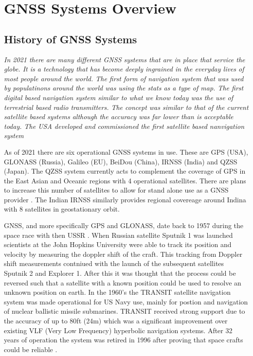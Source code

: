 
\chapter{GNSS Systems Overview} %

\label{Chapter2} %


\section{History of GNSS Systems}
\emph{In 2021 there are many different GNSS systems that are in place that service the globe. It is a technology that has become deeply ingrained in the everyday lives of
most people around the world. The first form of navigation system that was used by populatinons around the world was using the stats as a type of map. The first digital
based navigation system similar to what we know today was the use of terrestrial based radio transmitters. The concept was similar to that of the current satellite based
systems although the accuracy was far lower than is acceptable today. The USA developed and commissioned the first satellite based nanvigation system}

As of 2021 there are six operational GNSS systems in use. These are GPS (USA), GLONASS (Russia), Galileo (EU), BeiDou (China), IRNSS (India) and QZSS (Japan). The QZSS
system currently acts to complement the coverage of GPS in the East Asian and Oceanic regions with 4 operational satellites. There are plans to increase this number of
satellites to allow for stand alone use as a GNSS provider \cite{RN47}. The Indian IRNSS similarly provides regional covereage around Indina with 8 satellites in geostationary orbit. 

GNSS, and more specifically GPS and GLONASS, date back to 1957 during the space race with then USSR \cite{RN43}. When Russian satellite Sputnik 1 was launched scientists at the John Hopkins University were able to track its position and velocity by measuring the doppler shift of the
craft. This tracking from Doppler shift measurements contniued with the launch of the subsequent satellites Sputnik 2 and Explorer 1. After this it was thought that the
process could be reversed such that a satellite with a known position could be used to resolve an unknown position on earth. In the 1960's the TRANSIT satellite
navigation system was made operational for US Navy use, mainly for postion and navigation of nuclear ballistic missile submarines. TRANSIT received strong support due to
the accuracy of up to 80ft (24m) which was a significant improvement over existing VLF (Very Low Frequency) hyperbolic navigation systems. After 32 years of operation the
system was retired in 1996 after proving that space crafts could be reliable \cite{RN45}. 

